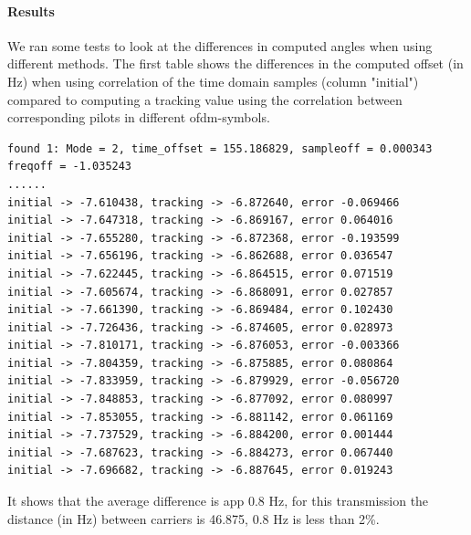 \documentclass[11pt]{article}
\begin{document}
\paragraph{Results}
We ran some tests to look at the differences in computed angles when
using different methods.
The first table shows the differences in the computed offset (in Hz)
when using correlation of the time domain samples (column "initial")
compared to computing a tracking value
using the correlation between corresponding pilots in different ofdm-symbols.
{\small
\begin{verbatim}
found 1: Mode = 2, time_offset = 155.186829, sampleoff = 0.000343 freqoff = -1.035243
......
initial -> -7.610438, tracking -> -6.872640, error -0.069466
initial -> -7.647318, tracking -> -6.869167, error 0.064016
initial -> -7.655280, tracking -> -6.872368, error -0.193599
initial -> -7.656196, tracking -> -6.862688, error 0.036547
initial -> -7.622445, tracking -> -6.864515, error 0.071519
initial -> -7.605674, tracking -> -6.868091, error 0.027857
initial -> -7.661390, tracking -> -6.869484, error 0.102430
initial -> -7.726436, tracking -> -6.874605, error 0.028973
initial -> -7.810171, tracking -> -6.876053, error -0.003366
initial -> -7.804359, tracking -> -6.875885, error 0.080864
initial -> -7.833959, tracking -> -6.879929, error -0.056720
initial -> -7.848853, tracking -> -6.877092, error 0.080997
initial -> -7.853055, tracking -> -6.881142, error 0.061169
initial -> -7.737529, tracking -> -6.884200, error 0.001444
initial -> -7.687623, tracking -> -6.884273, error 0.067440
initial -> -7.696682, tracking -> -6.887645, error 0.019243
\end{verbatim}
}
It shows that the average difference is app 0.8 Hz, for this transmission
the distance (in Hz) between carriers is 46.875, 0.8 Hz is less than 2\%.
\end{document}
